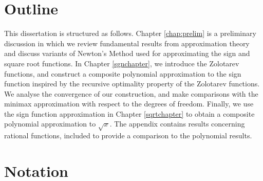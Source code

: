 \section*{Outline}

This dissertation is structured as follows. Chapter \ref{chap:prelim} is a preliminary discussion in which we review fundamental results from approximation theory and discuss variants of Newton's Method used for approximating the sign and square root functions. In Chapter \ref{sgnchapter}, we introduce the Zolotarev functions, and construct a composite polynomial approximation to the sign function inspired by the recursive optimality property of the Zolotarev functions. We analyse the convergence of our construction, and make comparisons with the minimax approximation with respect to the degrees of freedom. Finally, we use the sign function approximation in Chapter \ref{sqrtchapter} to obtain a composite polynomial approximation to $\sqrt{x}$. The appendix contains results concerning rational functions, included to provide a comparison to the polynomial results.


\section*{Notation}

